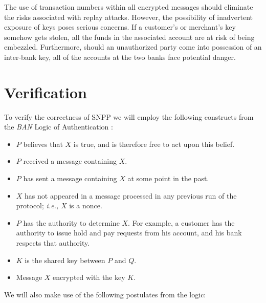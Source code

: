 The use of transaction numbers within all encrypted messages should
eliminate the risks associated with replay attacks.  However, the
possibility of inadvertent exposure of keys poses serious concerns.  If
a customer's or merchant's key somehow gets stolen, all the funds in the
associated account are at risk of being embezzled.  Furthermore, should an
unauthorized party come into possession of an inter-bank key, all of
the accounts at the two banks face potential danger.

\section{Verification}
To verify the correctness of SNPP we will employ the following constructs
from the {\em BAN} Logic of
Authentication \cite{kn:burrows89}:
\begin{itemize}
\item {} \parbox[t]{3.75in}{$P$ believes
that $X$ is true, and is therefore free to act upon this belief.}
\item {} \parbox[t]{3.75in}{$P$ received a
message containing $X$.}
\item {} \parbox[t]{3.75in}{$P$ has sent a
message containing $X$ at some point in the past.}
\item {} \parbox[t]{3.75in}{$X$ has not
appeared in a message processed in any previous run of the protocol; {\em
i.e.,} $X$ is a nonce.}
\item {} \parbox[t]{3.75in}{$P$ has the
authority to determine $X$.  For example, a customer has the  authority to
issue hold and pay requests from his account, and his bank respects that
authority.}
\item {}
\parbox[t]{3.75in} {$K$ is the shared key between $P$ and $Q$.}
\item {}
\parbox[t]{3.75in} {Message $X$ encrypted with the key $K$.}
\end{itemize}

\noindent
We will also make use of the following postulates from the logic:

